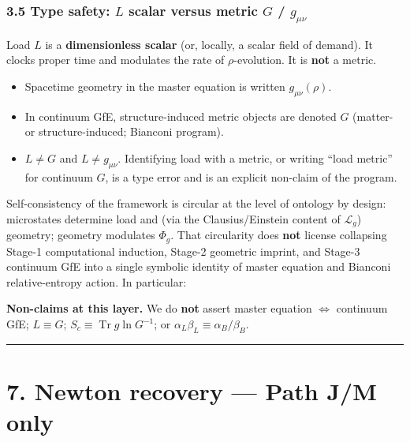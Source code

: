 \documentclass[
  11pt,
]{article}
\providecommand{\tightlist}{%
  \setlength{\itemsep}{0pt}\setlength{\parskip}{0pt}}
\begin{document}
\subsubsection{\texorpdfstring{3.5 Type safety: \(L\) scalar versus metric \(G\) / \(g_{\mu\nu}\)}{3.5 Type safety: L scalar versus metric G / g\_\{\textbackslash mu\textbackslash nu\}}}\label{type-safety-l-scalar-versus-metric-g-g_munu}

Load \(L\) is a \textbf{dimensionless scalar} (or, locally, a scalar field of demand). It clocks proper time and modulates the rate of \(\rho\)-evolution. It is \textbf{not} a metric.

\begin{itemize}
\tightlist
\item
  Spacetime geometry in the master equation is written \(g_{\mu\nu}(\rho)\).\\
\item
  In continuum GfE, structure-induced metric objects are denoted \(G\) (matter- or structure-induced; Bianconi program).\\
\item
  \textbf{\(L \neq G\)} and \textbf{\(L \neq g_{\mu\nu}\)}. Identifying load with a metric, or writing ``load metric'' for continuum \(G\), is a type error and is an explicit non-claim of the program.
\end{itemize}

Self-consistency of the framework is circular at the level of ontology by design: microstates determine load and (via the Clausius/Einstein content of \(\mathcal{L}_g\)) geometry; geometry modulates \(\Phi_g\). That circularity does \textbf{not} license collapsing Stage-1 computational induction, Stage-2 geometric imprint, and Stage-3 continuum GfE into a single symbolic identity of master equation and Bianconi relative-entropy action. In particular:

\textbf{Non-claims at this layer.} We do \textbf{not} assert master equation \(\Leftrightarrow\) continuum GfE; \(L\equiv G\); \(S_c\equiv\operatorname{Tr} g\ln G^{-1}\); or \(\alpha_L\beta_L\equiv\alpha_B/\beta_B\).

\begin{center}\rule{0.5\linewidth}{0.5pt}\end{center}

\section{7. Newton recovery --- Path J/M only}\label{newton-recovery-path-jm-only}
\end{document}
